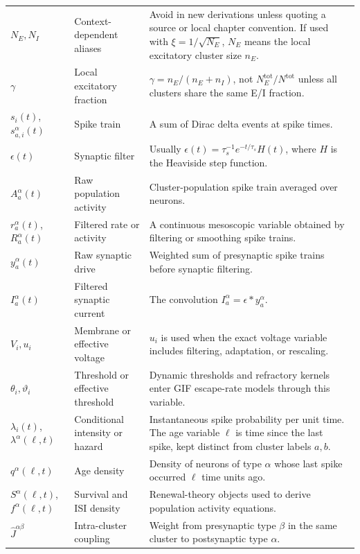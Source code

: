 \begin{longtable}{@{}p{}p{}p{}@{}}
\(N_E,N_I\) & Context-dependent aliases & Avoid in new derivations unless quoting a source or local chapter convention. If used with \(\xi=1/\sqrt{N_E}\), \(N_E\) means the local excitatory cluster size \(n_E\). \\
\(\gamma\) & Local excitatory fraction & \(\gamma=n_E/(n_E+n_I)\), not \(N_E^{\mathrm{tot}}/N^{\mathrm{tot}}\) unless all clusters share the same E/I fraction. \\
\(s_i(t)\), \(s_{a,i}^{\alpha}(t)\) & Spike train & A sum of Dirac delta events at spike times. \\
\(\epsilon(t)\) & Synaptic filter & Usually \(\epsilon(t)=\tau_s^{-1}e^{-t/\tau_s}H(t)\), where \(H\) is the Heaviside step function. \\
\(A_a^\alpha(t)\) & Raw population activity & Cluster-population spike train averaged over neurons. \\
\(r_a^\alpha(t)\), \(R_a^\alpha(t)\) & Filtered rate or activity & A continuous mesoscopic variable obtained by filtering or smoothing spike trains. \\
\(y_a^\alpha(t)\) & Raw synaptic drive & Weighted sum of presynaptic spike trains before synaptic filtering. \\
\(I_a^\alpha(t)\) & Filtered synaptic current & The convolution \(I_a^\alpha=\epsilon*y_a^\alpha\). \\
\(V_i,u_i\) & Membrane or effective voltage & \(u_i\) is used when the exact voltage variable includes filtering, adaptation, or rescaling. \\
\(\theta_i,\vartheta_i\) & Threshold or effective threshold & Dynamic thresholds and refractory kernels enter GIF escape-rate models through this variable. \\
\(\lambda_i(t)\), \(\lambda^\alpha(\ell,t)\) & Conditional intensity or hazard & Instantaneous spike probability per unit time. The age variable \(\ell\) is time since the last spike, kept distinct from cluster labels \(a,b\). \\
\(q^\alpha(\ell,t)\) & Age density & Density of neurons of type \(\alpha\) whose last spike occurred \(\ell\) time units ago. \\
\(S^\alpha(\ell,t)\), \(f^\alpha(\ell,t)\) & Survival and ISI density & Renewal-theory objects used to derive population activity equations. \\
\(\widehat J^{\alpha\beta}\) & Intra-cluster coupling & Weight from presynaptic type \(\beta\) in the same cluster to postsynaptic type \(\alpha\). \\

\end{longtable}

